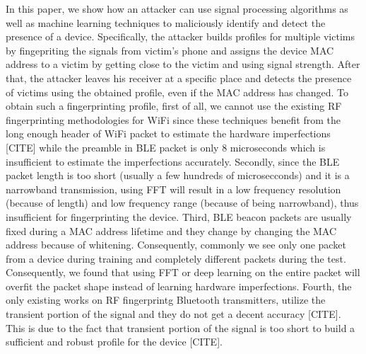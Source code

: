 In this paper, we show how an attacker can use signal processing algorithms as well as machine learning techniques to maliciously identify and detect the presence of a device. Specifically, the attacker builds profiles for multiple victims by fingepriting the signals from victim's phone and assigns the device MAC address to a victim by getting close to the victim and using signal strength. After that, the attacker leaves his receiver at a specific place and detects the presence of victims using the obtained profile, even if the MAC address has changed. To obtain such a fingerprinting profile, first of all, we cannot use the existing RF fingerprinting methodologies for WiFi since these techniques benefit from the long enough header of WiFi packet to estimate the hardware imperfections [CITE] while the preamble in BLE packet is only 8 microseconds which is insufficient to estimate the imperfections accurately. Secondly, since the BLE packet length is too short (usually a few hundreds of microsecconds) and it is a narrowband transmission, using FFT will result in a low frequency resolution (because of length) and low frequency range (because of being narrowband), thus insufficient for fingerprinting the device. Third, BLE beacon packets are usually fixed during a MAC address lifetime and they change by changing the MAC address because of whitening. Consequently, commonly we see only one packet from a device during training and completely different packets during the test. Consequently, we found that using FFT or deep learning on the entire packet will overfit the packet shape instead of learning hardware imperfections. Fourth, the only existing works on RF fingerprintg Bluetooth transmitters, utilize the transient portion of the signal and they do not get a decent accuracy [CITE]. This is due to the fact that transient portion of the signal is too short to build a sufficient and robust profile for the device [CITE].\\

